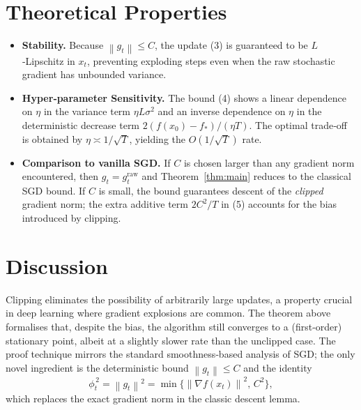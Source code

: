 \documentclass{article}
\newcommand{\norm}[1]{\left\lVert#1\right\rVert}
\begin{document}
\section*{Theoretical Properties}
\begin{itemize}[leftmargin=*]
\item \textbf{Stability.} Because $\norm{g_t}\le C$, the update (3) is
guaranteed to be $L$‑Lipschitz in $x_t$, preventing exploding steps even when the
raw stochastic gradient has unbounded variance.
\item \textbf{Hyper‑parameter Sensitivity.}
The bound (4) shows a linear dependence on $\eta$ in the variance term
$\eta L\sigma^{2}$ and an inverse dependence on $\eta$ in the deterministic
decrease term $2(f(x_0)-f_*)/(\eta T)$. The optimal trade‑off is obtained by
$\eta\asymp 1/\sqrt{T}$, yielding the $O(1/\sqrt{T})$ rate.
\item \textbf{Comparison to vanilla SGD.}
If $C$ is chosen larger than any gradient norm encountered, then $g_t=
g^{\text{raw}}_t$ and Theorem~\ref{thm:main} reduces to the classical SGD bound.
If $C$ is small, the bound guarantees descent of the \emph{clipped} gradient
norm; the extra additive term $2C^{2}/T$ in (5) accounts for the bias introduced
by clipping.
\end{itemize}

\section*{Discussion}
Clipping eliminates the possibility of arbitrarily large updates, a property
crucial in deep learning where gradient explosions are common. The theorem above
formalises that, despite the bias, the algorithm still converges to a
(first‑order) stationary point, albeit at a slightly slower rate than the
unclipped case. The proof technique mirrors the standard smoothness‑based
analysis of SGD; the only novel ingredient is the deterministic bound
$\norm{g_t}\le C$ and the identity
\[
\phi_t^{\,2}= \norm{g_t}^{2}= \min\!\bigl\{\norm{\nabla f(x_t)}^{2},\,C^{2}\bigr\},
\]
which replaces the exact gradient norm in the classic descent lemma.

\end{document}
